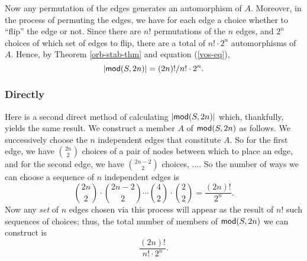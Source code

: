 Now any permutation of the edges generates an automorphism of $A$. Moreover, in the process of permuting the edges, we have for each edge a choice whether to ``flip'' the edge or not. Since there are $n!$ permutations of the $n$ edges, and $2^n$ choices of which set of edges to flip, there are a total of $n!\cdot 2^n$ automorphisms of $A$. Hence, by Theorem \ref{orb-stab-thm} and equation (\ref{vos-eq}), 
 \[
 \mbox{$|\mbox{$\mathsf{mod}(S,2n)$}|$}= (2n)!/n!\cdot 2^n.
 \]

\subsubsection*{Directly}
Here is a second direct method of calculating $\mbox{$|\mbox{$\mathsf{mod}(S,2n)$}|$}$ which, thankfully, yields the same result.%
We construct a member $A$ of $\mbox{$\mathsf{mod}(S,2n)$}$ as follows. We successively choose the $n$ independent edges that constitute $A$. So for the first edge, we have $\binom{2n}{2}$ choices of a pair of nodes between which to place an edge, and for the second edge, we have $\binom{2n-2}{2}$ choices, .... So the number of ways we can choose a sequence of $n$ independent edges is
\[
\binom{2n}{2}\cdot\binom{2n-2}{2}\cdots\binom{4}{2}\cdot\binom{2}{2}= \frac{(2n)!}{2^n}.
\]
Now any \emph{set} of $n$ edges chosen via this process will appear as the result of $n!$ such sequences of choices; thus, the total number of members of $\mbox{$\mathsf{mod}(S,2n)$}$ we can construct is 
\[
\frac{(2n)!}{n!\cdot 2^n}.
\]